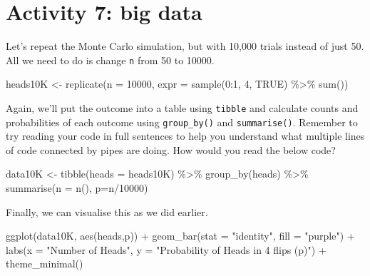\documentclass[
  oneside]{book}
\newenvironment{Shaded}{\begin{snugshade}}{\end{snugshade}}
\newcommand{\AttributeTok}[1]{\textcolor[rgb]{0.77,0.63,0.00}{#1}}
\newcommand{\ConstantTok}[1]{\textcolor[rgb]{0.00,0.00,0.00}{#1}}
\newcommand{\DecValTok}[1]{\textcolor[rgb]{0.00,0.00,0.81}{#1}}
\newcommand{\FunctionTok}[1]{\textcolor[rgb]{0.00,0.00,0.00}{#1}}
\newcommand{\NormalTok}[1]{#1}
\newcommand{\OtherTok}[1]{\textcolor[rgb]{0.56,0.35,0.01}{#1}}
\newcommand{\SpecialCharTok}[1]{\textcolor[rgb]{0.00,0.00,0.00}{#1}}
\newcommand{\StringTok}[1]{\textcolor[rgb]{0.31,0.60,0.02}{#1}}
\begin{document}
\hypertarget{activity-7-big-data}{%
\section{Activity 7: big data}\label{activity-7-big-data}}

Let's repeat the Monte Carlo simulation, but with 10,000 trials instead of just 50. All we need to do is change \texttt{n} from 50 to 10000.

\begin{Shaded}
\begin{Highlighting}[]
\NormalTok{heads10K }\OtherTok{\textless{}{-}} \FunctionTok{replicate}\NormalTok{(}\AttributeTok{n =} \DecValTok{10000}\NormalTok{, }\AttributeTok{expr =} \FunctionTok{sample}\NormalTok{(}\DecValTok{0}\SpecialCharTok{:}\DecValTok{1}\NormalTok{, }\DecValTok{4}\NormalTok{, }\ConstantTok{TRUE}\NormalTok{) }\SpecialCharTok{\%\textgreater{}\%} \FunctionTok{sum}\NormalTok{())   }
\end{Highlighting}
\end{Shaded}

Again, we'll put the outcome into a table using \texttt{tibble} and calculate counts and probabilities of each outcome using \texttt{group\_by()} and \texttt{summarise()}. Remember to try reading your code in full sentences to help you understand what multiple lines of code connected by pipes are doing. How would you read the below code?

\begin{Shaded}
\begin{Highlighting}[]
\NormalTok{data10K }\OtherTok{\textless{}{-}} \FunctionTok{tibble}\NormalTok{(}\AttributeTok{heads =}\NormalTok{ heads10K) }\SpecialCharTok{\%\textgreater{}\%}   
                \FunctionTok{group\_by}\NormalTok{(heads) }\SpecialCharTok{\%\textgreater{}\%}           
                \FunctionTok{summarise}\NormalTok{(}\AttributeTok{n =} \FunctionTok{n}\NormalTok{(), }\AttributeTok{p=}\NormalTok{n}\SpecialCharTok{/}\DecValTok{10000}\NormalTok{) }
\end{Highlighting}
\end{Shaded}

Finally, we can visualise this as we did earlier.

\begin{Shaded}
\begin{Highlighting}[]
\FunctionTok{ggplot}\NormalTok{(data10K, }\FunctionTok{aes}\NormalTok{(heads,p)) }\SpecialCharTok{+} 
  \FunctionTok{geom\_bar}\NormalTok{(}\AttributeTok{stat =} \StringTok{"identity"}\NormalTok{, }\AttributeTok{fill =} \StringTok{"purple"}\NormalTok{) }\SpecialCharTok{+} 
  \FunctionTok{labs}\NormalTok{(}\AttributeTok{x =} \StringTok{"Number of Heads"}\NormalTok{, }\AttributeTok{y =} \StringTok{"Probability of Heads in 4 flips (p)"}\NormalTok{) }\SpecialCharTok{+}
  \FunctionTok{theme\_minimal}\NormalTok{()}
\end{Highlighting}
\end{Shaded}
\end{document}
